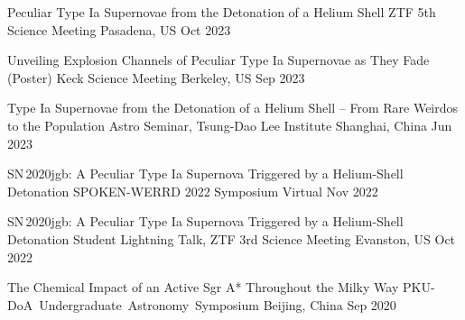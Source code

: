 


\begin{cventries}
	
	\cventry
	{Peculiar Type Ia Supernovae from the Detonation of a Helium Shell}
	{ZTF 5th Science Meeting}
	{Pasadena, US}
	{Oct 2023}
	{}
	
	\cventry
	{Unveiling Explosion Channels of Peculiar Type Ia Supernovae as They Fade (Poster)}
	{Keck Science Meeting}
	{Berkeley, US}
	{Sep 2023}
	{}

	\cventry
	{Type Ia Supernovae from the Detonation of a Helium Shell -- From Rare Weirdos to the Population}
	{Astro Seminar, Tsung-Dao Lee Institute}
	{Shanghai, China}
	{Jun 2023}
	{}

	\cventry
	{SN\,2020jgb: A Peculiar Type Ia Supernova Triggered by a Helium-Shell Detonation} %
	{SPOKEN-WERRD 2022 Symposium} %
	{Virtual} %
	{Nov 2022} %
	{}

	\cventry
	{SN\,2020jgb: A Peculiar Type Ia Supernova Triggered by a Helium-Shell Detonation} %
	{Student Lightning Talk, ZTF 3rd Science Meeting} %
	{Evanston, US} %
	{Oct 2022} %
	{}
	
	\cventry
	{The Chemical Impact of an Active Sgr A* Throughout the Milky Way} %
	{PKU-DoA Undergraduate Astronomy Symposium} %
	{Beijing, China} %
	{Sep 2020} %
	{}


\end{cventries}
